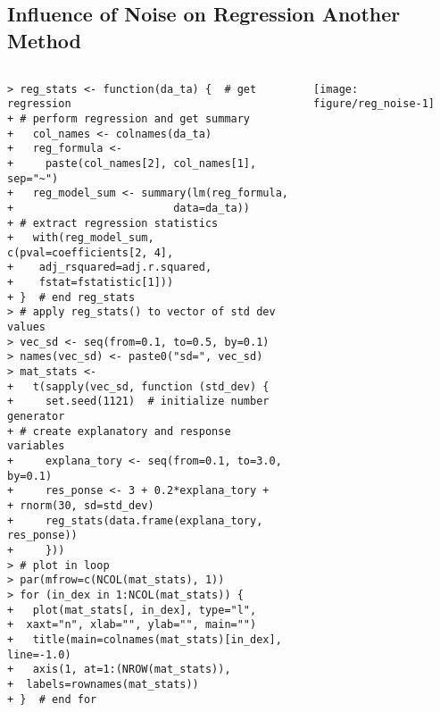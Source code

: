 \documentclass[10pt]{beamer}\usepackage[]{graphicx}\usepackage[]{color}
\makeatletter
\newenvironment{kframe}{%
 \def\at@end@of@kframe{}%
 \ifinner\ifhmode%
  \def\at@end@of@kframe{\end{minipage}}%
  \begin{minipage}{\columnwidth}%
 \fi\fi%
 \def\FrameCommand##1{\hskip\@totalleftmargin \hskip-\fboxsep
 \colorbox{shadecolor}{##1}\hskip-\fboxsep
     \hskip-\linewidth \hskip-\@totalleftmargin \hskip\columnwidth}%
 \MakeFramed {\advance\hsize-\width
   \@totalleftmargin\z@ \linewidth\hsize
   \@setminipage}}%
 {\par\unskip\endMakeFramed%
 \at@end@of@kframe}
\newenvironment{knitrout}{}{} %
\makeatother
\begin{document}
\subsection{Influence of Noise on Regression Another Method}
\begin{frame}[fragile,t]{\subsecname}
\vspace{-1em}
\begin{block}{}
  \begin{columns}[T]
    \vspace{-2em}
\begin{knitrout}\scriptsize
{}\color{fgcolor}\begin{kframe}
\begin{verbatim}
> reg_stats <- function(da_ta) {  # get regression
+ # perform regression and get summary
+   col_names <- colnames(da_ta)
+   reg_formula <-
+     paste(col_names[2], col_names[1], sep="~")
+   reg_model_sum <- summary(lm(reg_formula,
+                         data=da_ta))
+ # extract regression statistics
+   with(reg_model_sum, c(pval=coefficients[2, 4],
+    adj_rsquared=adj.r.squared,
+    fstat=fstatistic[1]))
+ }  # end reg_stats
> # apply reg_stats() to vector of std dev values
> vec_sd <- seq(from=0.1, to=0.5, by=0.1)
> names(vec_sd) <- paste0("sd=", vec_sd)
> mat_stats <-
+   t(sapply(vec_sd, function (std_dev) {
+     set.seed(1121)  # initialize number generator
+ # create explanatory and response variables
+     explana_tory <- seq(from=0.1, to=3.0, by=0.1)
+     res_ponse <- 3 + 0.2*explana_tory +
+ rnorm(30, sd=std_dev)
+     reg_stats(data.frame(explana_tory, res_ponse))
+     }))
> # plot in loop
> par(mfrow=c(NCOL(mat_stats), 1))
> for (in_dex in 1:NCOL(mat_stats)) {
+   plot(mat_stats[, in_dex], type="l",
+  xaxt="n", xlab="", ylab="", main="")
+   title(main=colnames(mat_stats)[in_dex], line=-1.0)
+   axis(1, at=1:(NROW(mat_stats)),
+  labels=rownames(mat_stats))
+ }  # end for
\end{verbatim}
\end{kframe}
\end{knitrout}
      \vspace{-1em}
      \texttt{[image: figure/reg\_noise-1]}
  \end{columns}
\end{block}

\end{frame}


\end{document}
